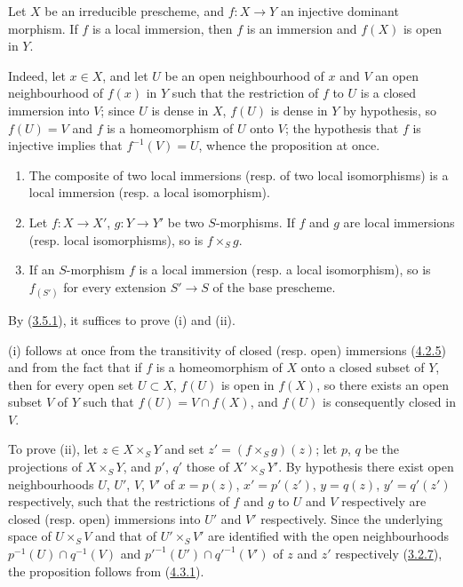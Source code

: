 \begin{proposition}[4.5.4]
\label{I.4.5.4}
Let $X$ be an irreducible prescheme, and $f:X\to Y$ an injective dominant
morphism. If $f$ is a local immersion, then $f$ is an immersion and $f(X)$
is open in $Y$.
\end{proposition}

Indeed, let $x\in X$, and let $U$ be an open neighbourhood of $x$ and $V$ an
open neighbourhood of $f(x)$ in $Y$ such that the restriction of $f$ to $U$
is a closed immersion into $V$; since $U$ is dense in $X$, $f(U)$
is dense in $Y$ by hypothesis, so $f(U)=V$ and $f$ is a homeomorphism
of $U$ onto $V$; the hypothesis that $f$ is injective implies that
$f^{-1}(V)=U$, whence the proposition at once.

\begin{proposition}[4.5.5]
\label{I.4.5.5}
\begin{enumerate}
  \item[\rm(i)] The composite of two local immersions (\textup{resp.} of two
    local isomorphisms) is a local immersion (\textup{resp.} a local
    isomorphism).
  \item[\rm(ii)] Let $f:X\to X'$, $g:Y\to Y'$ be two $S$-morphisms. If
    $f$ and $g$ are local immersions (\textup{resp.} local isomorphisms),
    so is $f\times_S g$.
  \item[\rm(iii)] If an $S$-morphism $f$ is a local immersion (\textup{resp.} a
    local isomorphism), so is $f_{(S')}$ for every extension
    $S'\to S$ of the base prescheme.
\end{enumerate}
\end{proposition}

By (\hyperref[I.3.5.1]{3.5.1}), it suffices to prove (i) and (ii).

(i) follows at once from the transitivity of closed (resp.
open) immersions (\hyperref[I.4.2.5]{4.2.5}) and from the fact that if $f$
is a homeomorphism of $X$ onto a closed subset of $Y$, then for every open set
$U\subset X$, $f(U)$ is open in $f(X)$, so there exists an open
subset $V$ of $Y$ such that $f(U)=V\cap f(X)$, and $f(U)$ is consequently
closed in $V$.

To prove (ii), let $z\in X\times_S Y$ and set $z'=(f\times_S g)(z)$; let $p$, $q$ be the projections of $X\times_S Y$, and $p'$,
$q'$ those of $X'\times_S Y'$. By hypothesis there exist open
neighbourhoods $U$, $U'$, $V$, $V'$ of $x=p(z)$, $x'=p'(z')$, $y=q(z)$,
$y'=q'(z')$ respectively, such that the restrictions of $f$ and $g$ to $U$
and $V$ respectively are closed (resp. open) immersions into
$U'$ and $V'$ respectively. Since the underlying space of $U\times_S V$ and
that of $U'\times_S V'$ are identified with the open neighbourhoods
$p^{-1}(U)\cap q^{-1}(V)$ and ${p'}^{-1}(U')\cap{q'}^{-1}(V')$ of $z$ and
$z'$ respectively (\hyperref[I.3.2.7]{3.2.7}), the proposition follows
from (\hyperref[I.4.3.1]{4.3.1}).
